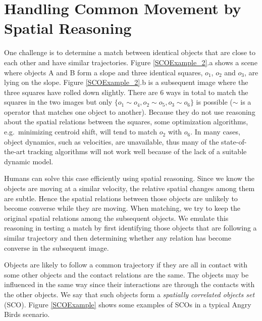 \documentclass[letterpaper]{article}
\begin{document}
\section{Handling Common Movement by Spatial Reasoning}
\label{CM}

One challenge is to determine a match between identical objects that are close to each other and have similar trajectories. Figure \ref{SCOExample_2}.a  shows a scene where objects A and B form a slope and three identical squares, $o_1$, $o_2$ and $o_3$, are lying on the slope. Figure \ref{SCOExample_2}.b is a subsequent image where the three squares have rolled down slightly. There are 6 ways in total to match the squares in the two images but only $\{o_1 \sim o_4, o_2 \sim o_5, o_3 \sim o_6\}$ is possible ($\sim$ is a operator that matches one object to another). Because they do not use reasoning about the spatial relations between the squares, some optimization algorithms, e.g.\ minimizing centroid shift, will tend to match $o_2$ with $o_6$. In many cases, object dynamics, such as velocities, are unavailable, thus many of the state-of-the-art tracking algorithms will not work well because of the lack of a suitable dynamic model. 

Humans can solve this case efficiently using spatial reasoning. Since we know the objects are moving at a similar velocity, the relative spatial changes among them are subtle. Hence the spatial relations between those objects are unlikely to become converse while they are moving. When matching, we try to keep the original spatial relations among the subsequent objects. We emulate this reasoning in testing a match by first identifying those objects that are following a similar trajectory and then determining whether any relation has become converse in the subsequent image. 

Objects are likely to follow a common trajectory if they are all in contact with some other objects and the contact relations are the same. The objects may be influenced in the same way since their interactions are through the contacts with the other objects. We say that such objects form a \emph{spatially correlated objects set} (SCO). Figure \ref{SCOExample} shows some examples of SCOs in a typical Angry Birds scenario.
\end{document}
